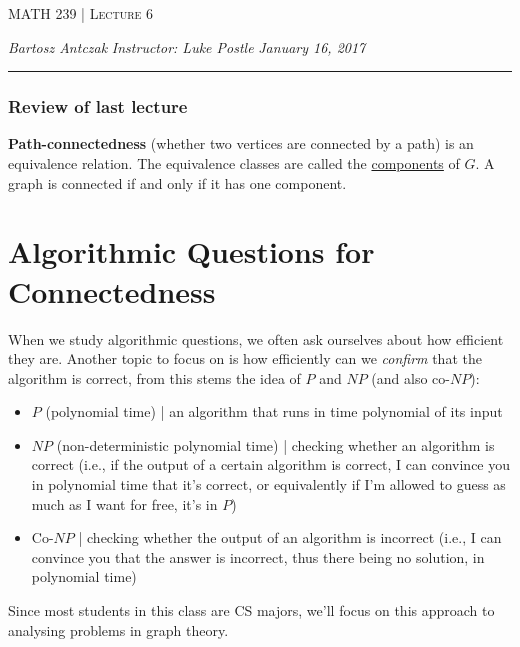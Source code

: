 \documentclass{report}
\newcommand{\lectureNum}{6}
\newcommand{\curDate}{January 16, 2017}
\newcommand{\course}{MATH 239}
\newcommand{\instructor}{Luke Postle}
\begin{document}
\begin{center}
\begin{Large}
\textsc{\course{} | Lecture \lectureNum{}}
\end{Large}
\end{center} 
\noindent \textit{Bartosz Antczak} \hfill
\textit{Instructor: \instructor{}} \hfill
\textit{\curDate{}}
\rule{\textwidth}{0.4pt}

\subsubsection{Review of last lecture}
\textbf{Path-connectedness} (whether two vertices are connected by a path) is an equivalence relation. The equivalence classes are called the \underline{components} of $G$. A graph is connected if and only if it has one component.
\section{Algorithmic Questions for Connectedness}
When we study algorithmic questions, we often ask ourselves about how efficient they are. Another topic to focus on is how efficiently can we \textit{confirm} that the algorithm is correct, from this stems the idea of $P$ and $NP$ (and also co-$NP$):
\begin{itemize}
\item $P$ (polynomial time) | an algorithm that runs in time polynomial of its input
\item $NP$ (non-deterministic polynomial time) | checking whether an algorithm is correct (i.e., if the output of a certain algorithm is correct, I can convince you in polynomial time that it's correct, or equivalently if I'm allowed to guess as much as I want for free, it's in $P$)
\item Co-$NP$ | checking whether the output of an algorithm is incorrect (i.e., I can convince you that the answer is incorrect, thus there being no solution, in polynomial time)
\end{itemize}
Since most students in this class are CS majors, we'll focus on this approach to analysing problems in graph theory.
\end{document}
